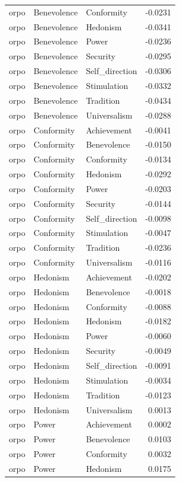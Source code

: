 \begin{tabular}{lllr}
orpo & Benevolence & Conformity & -0.0231 \\
orpo & Benevolence & Hedonism & -0.0341 \\
orpo & Benevolence & Power & -0.0236 \\
orpo & Benevolence & Security & -0.0295 \\
orpo & Benevolence & Self\_direction & -0.0306 \\
orpo & Benevolence & Stimulation & -0.0332 \\
orpo & Benevolence & Tradition & -0.0434 \\
orpo & Benevolence & Universalism & -0.0288 \\
orpo & Conformity & Achievement & -0.0041 \\
orpo & Conformity & Benevolence & -0.0150 \\
orpo & Conformity & Conformity & -0.0134 \\
orpo & Conformity & Hedonism & -0.0292 \\
orpo & Conformity & Power & -0.0203 \\
orpo & Conformity & Security & -0.0144 \\
orpo & Conformity & Self\_direction & -0.0098 \\
orpo & Conformity & Stimulation & -0.0047 \\
orpo & Conformity & Tradition & -0.0236 \\
orpo & Conformity & Universalism & -0.0116 \\
orpo & Hedonism & Achievement & -0.0202 \\
orpo & Hedonism & Benevolence & -0.0018 \\
orpo & Hedonism & Conformity & -0.0088 \\
orpo & Hedonism & Hedonism & -0.0182 \\
orpo & Hedonism & Power & -0.0060 \\
orpo & Hedonism & Security & -0.0049 \\
orpo & Hedonism & Self\_direction & -0.0091 \\
orpo & Hedonism & Stimulation & -0.0034 \\
orpo & Hedonism & Tradition & -0.0123 \\
orpo & Hedonism & Universalism & 0.0013 \\
orpo & Power & Achievement & 0.0002 \\
orpo & Power & Benevolence & 0.0103 \\
orpo & Power & Conformity & 0.0032 \\
orpo & Power & Hedonism & 0.0175 \\

\end{tabular}
